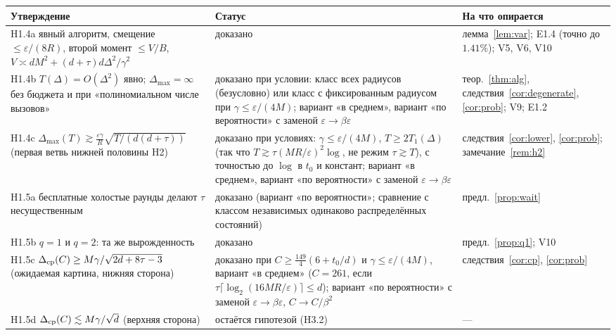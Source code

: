 \documentclass[11pt,a4paper]{article}
\numberwithin{equation}{section}
\theoremstyle{definition}
\theoremstyle{remark}
\newcommand{\Dmax}{\Delta_{\max}}\newcommand{\Dcp}{\Delta_{\rm cp}}
\begin{document}
\begin{center}\small
\begin{tabularx}{\textwidth}{@{}p{5.2cm}p{3.0cm}X@{}}
\toprule
\textbf{Утверждение} & \textbf{Статус} & \textbf{На что опирается}\\\midrule
H1.4a явный алгоритм, смещение $\le\varepsilon/(8R)$, второй момент $\le V/B$, $V\asymp dM^2+(d+\tau)d\Delta^2/\gamma^2$ & доказано & лемма~\ref{lem:var}; E1.4 (точно до $1.41\%$); V5, V6, V10 \\
H1.4b $T(\Delta)=O(\Delta^2)$ явно; $\Dmax=\infty$ без бюджета и при «полиномиальном числе вызовов» & доказано при условии: класс всех радиусов (безусловно) или класс с фиксированным радиусом при $\gamma\le\varepsilon/(4M)$; вариант «в среднем», вариант «по вероятности» с заменой $\varepsilon\to\beta\varepsilon$ & теор.~\ref{thm:alg}, следствия~\ref{cor:degenerate}, \ref{cor:prob}; V9; E1.2 \\
H1.4c $\Dmax(T)\gtrsim\frac{\varepsilon\gamma}R\sqrt{T/(d(d+\tau))}$ (первая ветвь нижней половины H2) & доказано при условиях: $\gamma\le\varepsilon/(4M)$, $T\ge2T_1(\Delta)$ (так что $T\gtrsim\tau(MR/\varepsilon)^2\log$, не режим $\tau\gtrsim T$), с точностью до $\log$ в $t_0$ и констант; вариант «в среднем», вариант «по вероятности» с заменой $\varepsilon\to\beta\varepsilon$ & следствия~\ref{cor:lower}, \ref{cor:prob}; замечание~\ref{rem:h2} \\
H1.5a бесплатные холостые раунды делают $\tau$ несущественным & доказано (вариант «по вероятности»; сравнение с классом независимых одинаково распределённых состояний) & предл.~\ref{prop:wait} \\
H1.5b $q=1$ и $q=2$: та же вырожденность & доказано & предл.~\ref{prop:q1}; V10 \\
H1.5c $\Dcp(C)\ge M\gamma/\sqrt{2d+8\tau-3}$ (ожидаемая картина, нижняя сторона) & доказано при $C\ge\frac{149}4(6+t_0/d)$ и $\gamma\le\varepsilon/(4M)$, вариант «в среднем» ($C=261$, если $\tau\lceil\log_2(16MR/\varepsilon)\rceil\le d$); вариант «по вероятности» с заменой $\varepsilon\to\beta\varepsilon$, $C\to C/\beta^2$ & следствия~\ref{cor:cp}, \ref{cor:prob} \\
H1.5d $\Dcp(C)\lesssim M\gamma/\sqrt d$ (верхняя сторона) & остаётся гипотезой (H3.2) & --- \\
\bottomrule
\end{tabularx}
\end{center}

\end{document}
